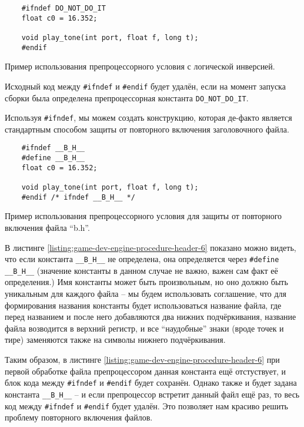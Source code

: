 \documentclass[../sparc.tex]{subfiles}
\begin{document}
\begin{listing}[H]
  \begin{verbatim}
    #ifndef DO_NOT_DO_IT
    float c0 = 16.352;

    void play_tone(int port, float f, long t);
    #endif
  \end{verbatim}
  \label{listing:game-dev-engine-procedure-header-5}
  \caption{Пример использования препроцессорного условия с логической
    инверсией.}
\end{listing}

Исходный код между \texttt{#ifndef} и \texttt{#endif} будет
удалён, если на момент запуска сборки была определена препроцессорная константа
\texttt{DO_NOT_DO_IT}.

Используя \texttt{#ifndef}, мы можем создать конструкцию, которая
де-факто является стандартным способом защиты от повторного включения
заголовочного файла.

\begin{listing}[H]
  \begin{verbatim}
    #ifndef __B_H__
    #define __B_H__
    float c0 = 16.352;

    void play_tone(int port, float f, long t);
    #endif /* ifndef __B_H__ */
  \end{verbatim}
  \label{listing:game-dev-engine-procedure-header-6}
  \caption{Пример использования препроцессорного условия для защиты от
    повторного включения файла ``b.h''.}
\end{listing}

В листинге \ref{listing:game-dev-engine-procedure-header-6} показано можно
видеть, что если константа \texttt{__B_H__} не определена, она
определяется через \texttt{#define __B_H__} (значение константы в
данном случае не важно, важен сам факт её определения.)  Имя константы может
быть произвольным, но оно должно быть уникальным для каждого файла -- мы будем
использовать соглашение, что для формирования названия константы будет
использоваться название файла, где перед названием и после него добавляются два
нижних подчёркивания, название файла возводится в верхний регистр, и все
``наудобные'' знаки (вроде точек и тире) заменяются также на символы нижнего
подчёркивания.

Таким образом, в листинге \ref{listing:game-dev-engine-procedure-header-6} при
первой обработке файла препроцессором данная константа ещё отстуствует, и блок
кода между \texttt{#ifndef} и \texttt{#endif} будет сохранён.
Однако также и будет задана константа \texttt{__B_H__} -- и если
препроцессор встретит данный файл ещё раз, то весь код между
\texttt{#ifndef} и \texttt{#endif} будет удалён.  Это
позволяет нам красиво решить проблему повторного включения файлов.
\end{document}
